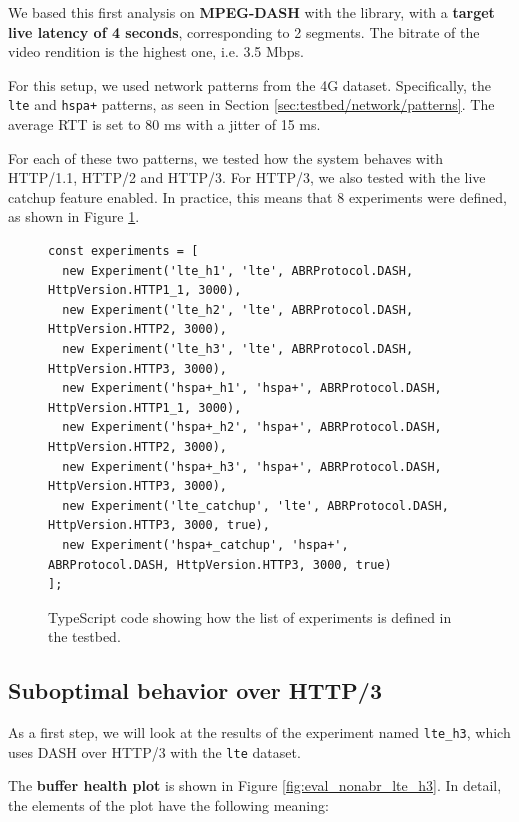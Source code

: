 We based this first analysis on \textbf{MPEG-DASH} with the \dashjs{} library, with a \textbf{target live latency of 4 seconds}, corresponding to 2 segments. The bitrate of the video rendition is the highest one, i.e. 3.5 Mbps.

For this setup, we used network patterns from the 4G dataset. Specifically, the \texttt{lte} and \texttt{hspa+} patterns, as seen in Section \ref{sec:testbed/network/patterns}. The average RTT is set to 80 ms with a jitter of 15 ms.

For each of these two patterns, we tested how the system behaves with HTTP/1.1, HTTP/2 and HTTP/3. For HTTP/3, we also tested with the live catchup feature enabled. In practice, this means that 8 experiments were defined, as shown in Figure \ref{fig:experiments1}.

\begin{figure}[h]
    \centering
    \begin{verbatim}
const experiments = [
  new Experiment('lte_h1', 'lte', ABRProtocol.DASH, HttpVersion.HTTP1_1, 3000),
  new Experiment('lte_h2', 'lte', ABRProtocol.DASH, HttpVersion.HTTP2, 3000),
  new Experiment('lte_h3', 'lte', ABRProtocol.DASH, HttpVersion.HTTP3, 3000),
  new Experiment('hspa+_h1', 'hspa+', ABRProtocol.DASH, HttpVersion.HTTP1_1, 3000),
  new Experiment('hspa+_h2', 'hspa+', ABRProtocol.DASH, HttpVersion.HTTP2, 3000),
  new Experiment('hspa+_h3', 'hspa+', ABRProtocol.DASH, HttpVersion.HTTP3, 3000),
  new Experiment('lte_catchup', 'lte', ABRProtocol.DASH, HttpVersion.HTTP3, 3000, true),
  new Experiment('hspa+_catchup', 'hspa+', ABRProtocol.DASH, HttpVersion.HTTP3, 3000, true)
];
    \end{verbatim}
    \caption{TypeScript code showing how the list of experiments is defined in the testbed.}
    \label{fig:experiments1}
\end{figure}

\subsection{Suboptimal behavior over HTTP/3}
\label{sec:eval/non-abr/h3-behavior}

As a first step, we will look at the results of the experiment named \texttt{lte\_h3}, which uses DASH over HTTP/3 with the \texttt{lte} dataset.

The \textbf{buffer health plot} is shown in Figure \ref{fig:eval_nonabr_lte_h3}. In detail, the elements of the plot have the following meaning:

